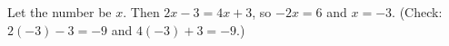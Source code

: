 Let the number be $x$. Then $2x-3=4x+3$, so $-2x=6$ and $x=\boxed{-3}$. (Check: $2(-3)-3=-9$ and $4(-3)+3=-9$.)
